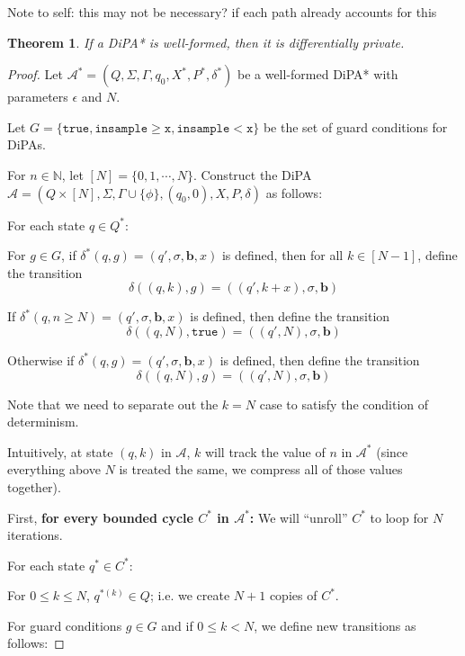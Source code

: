 \documentclass[12pt]{article}
\newcommand{\NN}{\mathbb{N}}
\newcommand{\gguard}{\texttt{insample} \geq \texttt{x}}
\newcommand{\lguard}{\texttt{insample} < \texttt{x}}
\newtheorem{thm}{Theorem}[section]
\theoremstyle{definition}
\begin{document}
Note to self: this may not be necessary? if each path already accounts for this


\begin{thm} 
	If a DiPA* is well-formed, then it is differentially private.
\end{thm}

\begin{proof}



Let $\mathcal{A}^* = (Q, \Sigma, \Gamma, q_0, X^*, P^*, \delta^*)$ be a well-formed DiPA* with parameters $\epsilon$ and $N$. 

Let $G = \{\texttt{true}, \gguard, \lguard \}$ be the set of guard conditions for DiPAs.

For $n\in \NN$, let $[N] = \{0, 1, \cdots , N\}$.
Construct the DiPA $\mathcal{A} = (Q \times [N], \Sigma, \Gamma\cup \{\phi\}, (q_0, 0), X, P, \delta)$ as follows:



For each state $q \in Q^*$:

For $g\in G$, if $\delta^*(q, g) = (q', \sigma, \mathbf{b}, x)$ is defined, then for all $k \in [N-1]$, define the transition
\[
	\delta((q, k), g) = ((q', k+x), \sigma, \mathbf{b})	
\]

If $\delta^*(q, n\geq N) = (q', \sigma, \mathbf{b}, x)$ is defined, then define the transition \[
	\delta((q, N), \texttt{true}) = ((q', N), \sigma, \mathbf{b})
\]

Otherwise if $\delta^*(q, g) = (q', \sigma, \mathbf{b}, x)$ is defined, then define the transition
\[
	\delta((q, N), g) = ((q', N), \sigma, \mathbf{b})
\]

Note that we need to separate out the $k = N$ case to satisfy the condition of determinism.

Intuitively, at state $(q, k)$ in $\mathcal{A}$, $k$ will track the value of $n$ in $\mathcal{A}^*$ (since everything above $N$ is treated the same, we compress all of those values together).



First, \textbf{for every bounded cycle $C^*$ in $\mathcal{A^*}$:}
We will ``unroll'' $C^*$ to loop for $N$ iterations.

For each state $q^*\in C^*$:

For $0\leq k \leq N$, $q^{*(k)} \in Q$; i.e. we create $N+1$ copies of $C^*$. 


For guard conditions $g\in G$ and if $0\leq k < N$, we define new transitions as follows:


\end{proof}
\end{document}
